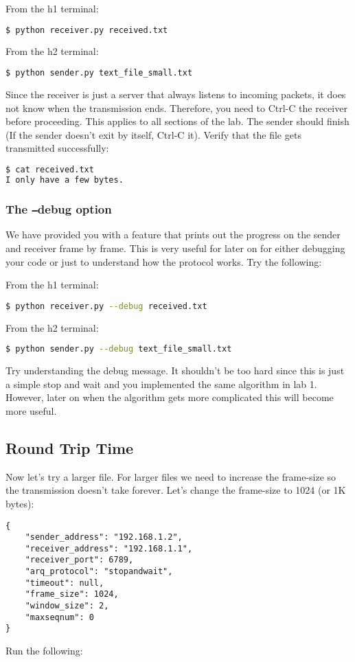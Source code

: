 \documentclass[11pt]{article}
\begin{document}
From the h1 terminal:
\begin{lstlisting}[language=bash]
$ python receiver.py received.txt
\end{lstlisting}
From the h2 terminal:
\begin{lstlisting}[language=bash]
$ python sender.py text_file_small.txt
\end{lstlisting}
Since the receiver is just a server that always listens to incoming packets, it does not know when the transmission ends. Therefore, you need to Ctrl-C the receiver before proceeding. This applies to all sections of the lab.
The sender should finish (If the sender doesn't exit by itself, Ctrl-C it). Verify that the file gets transmitted successfully:
\begin{lstlisting}[language=bash]
$ cat received.txt
I only have a few bytes.
\end{lstlisting}

\subsubsection {The \texttt{--}debug option}
We have provided you with a feature that prints out the progress on the sender and receiver frame by frame. This is very useful for later on for either debugging your code or just to understand how the protocol works. Try the following:

From the h1 terminal:
\begin{lstlisting}[language=bash]
$ python receiver.py --debug received.txt
\end{lstlisting}
From the h2 terminal:
\begin{lstlisting}[language=bash]
$ python sender.py --debug text_file_small.txt
\end{lstlisting}

Try understanding the debug message. It shouldn't be too hard since this is just a simple stop and wait and you implemented the same algorithm in lab 1. However, later on when the algorithm gets more complicated this will become more useful.

\subsection{Round Trip Time}
Now let's try a larger file. For larger files we need to increase the frame-size so the transmission doesn't take forever. Let's change the frame-size to 1024 (or 1K bytes):
\begin{lstlisting}[caption={Configuration For Large File}]
{
    "sender_address": "192.168.1.2",
    "receiver_address": "192.168.1.1",
    "receiver_port": 6789,
    "arq_protocol": "stopandwait",
    "timeout": null,
    "frame_size": 1024,
    "window_size": 2,
    "maxseqnum": 0
}
\end{lstlisting}
Run the following:
\end{document}
